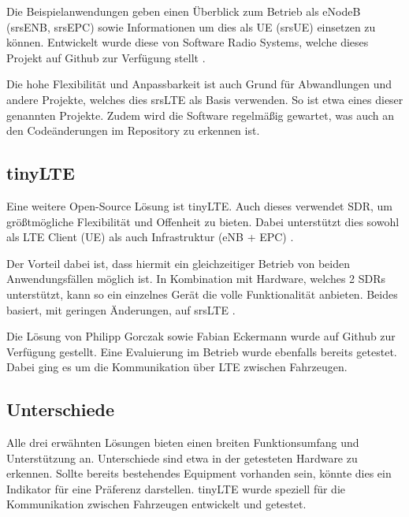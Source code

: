 Die Beispielanwendungen geben einen Überblick zum Betrieb als eNodeB (srsENB, srsEPC) sowie Informationen um dies als UE (srsUE) einsetzen zu können. Entwickelt wurde diese von Software Radio Systems, welche dieses Projekt auf Github zur Verfügung stellt \cite{githubSrSLTE}.

Die hohe Flexibilität und Anpassbarkeit ist auch Grund für Abwandlungen und andere Projekte, welches dies srsLTE als Basis verwenden. So ist etwa  eines dieser genannten Projekte. Zudem wird die Software regelmäßig gewartet, was auch an den Codeänderungen im Repository zu erkennen ist. 

\subsection{tinyLTE}
\label{tinyLTE}
Eine weitere Open-Source Lösung ist tinyLTE. Auch dieses verwendet SDR, um größtmögliche Flexibilität und Offenheit zu bieten. Dabei unterstützt dies sowohl als LTE Client (UE) als auch Infrastruktur (eNB + EPC) \cite{eckermann2018tinylte}.

Der Vorteil dabei ist, dass hiermit ein gleichzeitiger Betrieb von beiden Anwendungsfällen möglich ist. In Kombination mit Hardware, welches 2 SDRs unterstützt, kann so ein einzelnes Gerät die volle Funktionalität anbieten. 
Beides basiert, mit geringen Änderungen, auf srsLTE \cite{gomez2016srslte}. 

Die Lösung von Philipp Gorczak sowie Fabian Eckermann wurde auf Github zur Verfügung gestellt. Eine Evaluierung im Betrieb wurde ebenfalls bereits getestet. Dabei ging es um die Kommunikation über LTE zwischen Fahrzeugen. 

\subsection{Unterschiede}
Alle drei erwähnten Lösungen bieten einen breiten Funktionsumfang und Unterstützung an. Unterschiede sind etwa in der getesteten Hardware zu erkennen. Sollte bereits bestehendes Equipment vorhanden sein, könnte dies ein Indikator für eine Präferenz darstellen. 
tinyLTE wurde speziell für die Kommunikation zwischen Fahrzeugen entwickelt und getestet. 